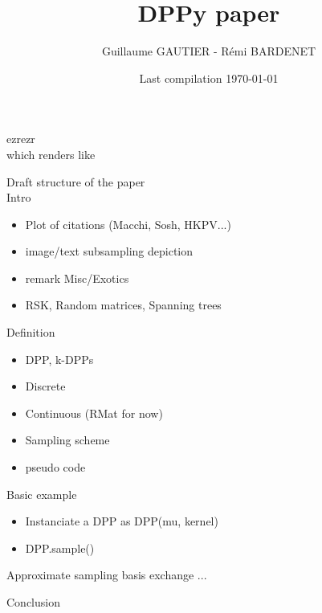 \documentclass{article}
\begin{document}

\title{DPPy paper}

\author{Guillaume GAUTIER - R\'emi BARDENET}


\date{
   Last compilation \today
      }


\maketitle

\listoftodos 

 ezrezr\\

 which renders like \\



\newpage

Draft structure of the paper\\

Intro
\begin{itemize}
	\item Plot of citations (Macchi, Sosh, HKPV...)
	\item image/text subsampling depiction
	\item remark Misc/Exotics
	\item RSK, Random matrices, Spanning trees
\end{itemize}


Definition
\begin{itemize}
	\item DPP, k-DPPs
	\item Discrete
	\item Continuous (RMat for now)
	\item Sampling scheme
	\item pseudo code
\end{itemize}


Basic example
\begin{itemize}
	\item Instanciate a DPP as DPP(mu, kernel)
	\item DPP.sample()
\end{itemize}


Approximate sampling
basis exchange ...

Conclusion


\newpage
% 
% 
\end{document}
